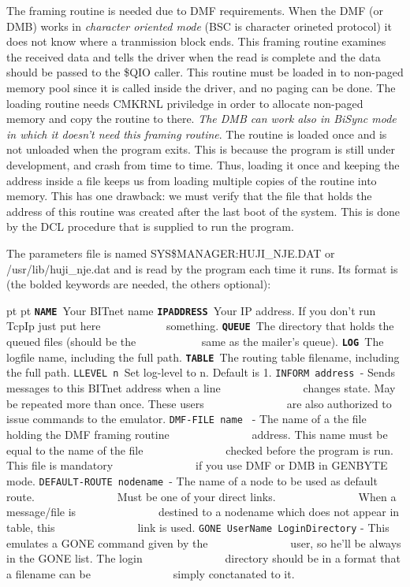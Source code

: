 The  framing  routine is needed due to DMF requirements. When the DMF
(or DMB) works in {\sl character oriented mode} (BSC  is  character  orineted
protocol)  it does not know where a tranmission block ends. This framing
routine examines the received data and tells the driver when the read is
complete  and the data should be passed to the \$QIO caller. This routine
must be loaded in to non-paged memory pool since it is called inside the
driver,  and  no  paging  can  be done. The loading routine needs CMKRNL
priviledge in order to allocate non-paged memory and copy the routine to
there.  {\sl The  DMB  can  work also in BiSync mode in which it doesn't need
this framing routine}.
The routine is loaded once and  is  not  unloaded  when  the  program
exits. This is because the program is still under development, and crash
from time to time. Thus, loading it once and keeping the address  inside
a file keeps us from loading multiple copies of the routine into memory.
This has one drawback: we must verify  that  the  file  that  holds  the
address  of  this routine was created after the last boot of the system.
This is done by the DCL procedure that is supplied to run the program.

\vfill\eject


The   parameters   file   is   named
{\ncrBold SYS\$MANAGER:HUJI\_NJE.DAT} or {\ncrBold /usr/lib/huji\_nje.dat}
and is read by the program each time it runs. Its
format is (the bolded keywords are needed, the others optional):

{\obeylines\obeyspaces{} pt  pt
{\tt\bf NAME        }Your BITnet name
{\tt\bf IPADDRESS   }Your IP address. If you don't run TcpIp just put here
{\tt ~~~~~~~~~~~}something.
{\tt\bf QUEUE       }The directory that holds the queued files (should be the
{\tt ~~~~~~~~~~~}same as the mailer's queue).
{\tt\bf LOG         }The logfile name, including the full path.
{\tt\bf TABLE       }The routing table filename, including the full path.
{\tt LLEVEL n    }Set log-level to n. Default is 1.
{\tt INFORM address }- Sends messages to this BITnet address when a line
{\tt ~~~~~~~~~~~~~~}changes state. May be repeated more than once. These users
{\tt ~~~~~~~~~~~~~~}are also authorized to issue commands to the emulator.
{\tt DMF-FILE name } - The name of a the file holding the DMF framing routine
{\tt ~~~~~~~~~~~~~~}address. This name must be equal to the name of the file
{\tt ~~~~~~~~~~~~~~}checked before the program is run. This file is mandatory
{\tt ~~~~~~~~~~~~~~}if you use DMF or DMB in GENBYTE mode.
{\tt DEFAULT-ROUTE nodename }- The name of a node to be used as default route.
{\tt ~~~~~~~~~~~~~~}{\ncrBold Must  be  one  of your direct links}.
{\tt ~~~~~~~~~~~~~~}When a message/file is
{\tt ~~~~~~~~~~~~~~}destined to a nodename which does not appear in table,  this
{\tt ~~~~~~~~~~~~~~}link is used.
{\tt GONE UserName LoginDirectory} - This emulates a GONE command given by the
{\tt ~~~~~~~~~~~~~~}user, so he'll  be  always  in  the  GONE  list.  The  login
{\tt ~~~~~~~~~~~~~~}directory  should  be  in  a  format that a filename can be
{\tt ~~~~~~~~~~~~~~}simply conctanated to it.
}

